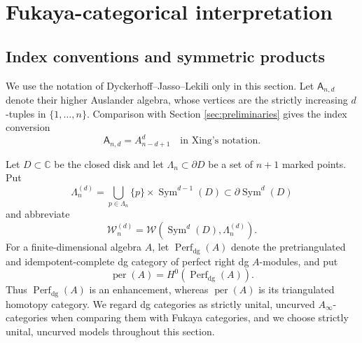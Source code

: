 \documentclass[12pt,a4paper,english,reqno]{amsart}
\theoremstyle{plain}
\theoremstyle{definition}
\newcommand{\perf}{\operatorname{per}}
\newcommand{\Wcat}{\mathcal W}
\begin{document}
\section{Fukaya-categorical interpretation}
\label{sec:fukaya}

\subsection{Index conventions and symmetric products}

We use the notation of Dyckerhoff--Jasso--Lekili \cite{DJL} only in this
section.  Let $\mathsf A_{n,d}$
denote their higher Auslander algebra, whose vertices are the strictly
increasing $d$-tuples in $\{1,\ldots,n\}$.  Comparison with Section 
\ref{sec:preliminaries} gives the index conversion
\begin{equation}
 \mathsf A_{n,d}=A_{n-d+1}^{d}
 \quad\text{in Xing's notation}.
\label{eq:DJL-index}
\end{equation}

Let $D\subset\mathbb C$ be the closed disk and let
$\Lambda_n\subset\partial D$ be a set of $n+1$ marked points.  Put
\begin{equation}
 \Lambda_n^{(d)}
 =
 \bigcup_{p\in\Lambda_n}
 \{p\}\times\operatorname{Sym}^{d-1}(D)
 \subset\partial\operatorname{Sym}^{d}(D)
\label{eq:symmetric-stops}
\end{equation}
and abbreviate
\begin{equation}
\Wcat_n^{(d)}
 =
 \Wcat\!\left(\operatorname{Sym}^{d}(D),\Lambda_n^{(d)}\right).
\label{eq:W-nd}
\end{equation}
For a finite-dimensional algebra $A$, let
$\operatorname{Perf}_{\mathrm{dg}}(A)$ denote the pretriangulated and
idempotent-complete dg category of perfect right dg $A$-modules, and put
\begin{equation}
 \perf(A)=H^0\!\left(\operatorname{Perf}_{\mathrm{dg}}(A)\right).
\label{eq:enhanced-perf-convention}
\end{equation}
Thus $\operatorname{Perf}_{\mathrm{dg}}(A)$ is an enhancement, whereas
$\perf(A)$ is its triangulated homotopy category.  We regard dg categories
as strictly unital, uncurved $A_\infty$-categories when comparing them with
Fukaya categories, and we choose strictly unital, uncurved models throughout
this section.
\end{document}
